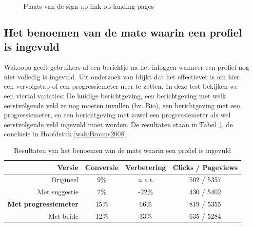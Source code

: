 \documentclass[a4paper, 10pt, pdftex]{report}
\begin{document}
      \begin{figure}
        \caption{Plaats van de sign-up link op landing pages}
      \end{figure}

    \subsection{Het benoemen van de mate waarin een profiel is ingevuld}
      \label{profileprogress}
      Wakoopa geeft gebruikers al een berichtje na het inloggen wanneer een profiel nog niet volledig is ingevuld. Uit onderzoek van \cite{Brouns2008} blijkt dat het effectiever is om hier een vervolgstap of een progressiemeter neer te zetten. In deze test bekijken we een viertal variaties: De huidige berichtgeving, een berichtgeving met welk eerstvolgende veld ze nog moeten invullen (bv. Bio), een berichtgeving met een progressiemeter, en een berichtgeving met zowel een progressiemeter als wel eerstvolgende veld ingevuld moet worden.  De resultaten staan in Tabel \ref{tab:profilecta}, de conclusie in Hoofdstuk \ref{wak:Brouns2008}

        \begin{table}[ht]
        \centering
        \begin{tabular}{r|*{3}{c}}
          \textbf{Versie}                   & Conversie  & Verbetering   & Clicks / Pageviews \\ \hline
          Origineel                         & 9\%        & \emph{n.v.t.} & 502 / 5357 \\
          Met suggestie                     & 7\%        & -22\%         & 430 / 5402\\
          \textbf{Met progressiemeter}      & 15\%       & 66\%          & 819 / 5355\\
          Met beide  & 12\%       & 33\%          & 635 / 5284\\
        \end{tabular}
        \caption{Resultaten van het benoemen van de mate waarin een profiel is ingevuld}
        \label{tab:profilecta}
        \end{table}
\end{document}
